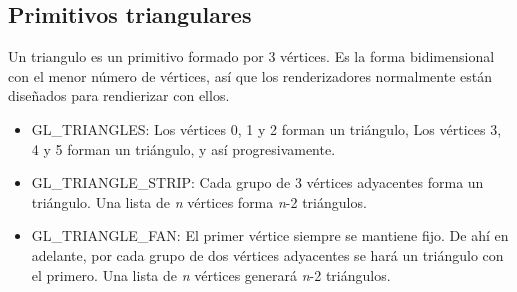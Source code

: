 \restoregeometry


\newpage



\subsection{Primitivos triangulares}
Un triangulo es un primitivo formado por 3 vértices. Es la forma bidimensional con el menor número de vértices, así que los renderizadores normalmente están diseñados para rendierizar con ellos.
\begin{itemize}
\item{GL\_TRIANGLES: Los vértices 0, 1 y 2 forman un triángulo, Los vértices 3, 4 y 5 forman un triángulo, y así progresivamente.}
\item{GL\_TRIANGLE\_STRIP: Cada grupo de 3 vértices adyacentes forma un triángulo. Una lista de \textit{n} vértices forma \textit{n}-2 triángulos.}
\item{GL\_TRIANGLE\_FAN: El primer vértice siempre se mantiene fijo. De ahí en adelante, por cada grupo de dos vértices adyacentes se hará un triángulo con el primero. Una lista de \textit{n} vértices generará \textit{n}-2 triángulos.}
\end{itemize}

